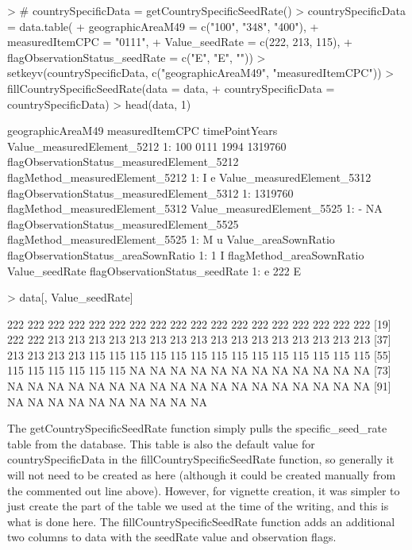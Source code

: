\documentclass[nojss]{jss}
\begin{document}
\begin{Schunk}
\begin{Sinput}
> # countrySpecificData = getCountrySpecificSeedRate()
> countrySpecificData = data.table(
+     geographicAreaM49 = c("100", "348", "400"),
+     measuredItemCPC = "0111",
+     Value_seedRate = c(222, 213, 115),
+     flagObservationStatus_seedRate = c("E", "E", ""))
> setkeyv(countrySpecificData, c("geographicAreaM49", "measuredItemCPC"))
> fillCountrySpecificSeedRate(data = data,
+                             countrySpecificData = countrySpecificData)
> head(data, 1)
\end{Sinput}
\begin{Soutput}
   geographicAreaM49 measuredItemCPC timePointYears Value_measuredElement_5212
1:               100            0111           1994                    1319760
   flagObservationStatus_measuredElement_5212 flagMethod_measuredElement_5212
1:                                          I                               e
   Value_measuredElement_5312 flagObservationStatus_measuredElement_5312
1:                    1319760                                           
   flagMethod_measuredElement_5312 Value_measuredElement_5525
1:                               -                         NA
   flagObservationStatus_measuredElement_5525 flagMethod_measuredElement_5525
1:                                          M                               u
   Value_areaSownRatio flagObservationStatus_areaSownRatio
1:                   1                                   I
   flagMethod_areaSownRatio Value_seedRate flagObservationStatus_seedRate
1:                        e            222                              E
\end{Soutput}
\begin{Sinput}
> data[, Value_seedRate]
\end{Sinput}
\begin{Soutput}
  [1] 222 222 222 222 222 222 222 222 222 222 222 222 222 222 222 222 222 222
 [19] 222 222 213 213 213 213 213 213 213 213 213 213 213 213 213 213 213 213
 [37] 213 213 213 213 115 115 115 115 115 115 115 115 115 115 115 115 115 115
 [55] 115 115 115 115 115 115  NA  NA  NA  NA  NA  NA  NA  NA  NA  NA  NA  NA
 [73]  NA  NA  NA  NA  NA  NA  NA  NA  NA  NA  NA  NA  NA  NA  NA  NA  NA  NA
 [91]  NA  NA  NA  NA  NA  NA  NA  NA  NA  NA
\end{Soutput}
\end{Schunk}

The getCountrySpecificSeedRate function simply pulls the specific\_seed\_rate
table from the database.  This table is also the default value for
countrySpecificData in the fillCountrySpecificSeedRate function, so generally
it will not need to be created as here (although it could be created manually
from the commented out line above).  However, for vignette creation, it was
simpler to just create the part of the table we used at the time of the
writing, and this is what is done here.  The fillCountrySpecificSeedRate
function adds an additional two columns to data with the seedRate value and
observation flags.
\end{document}
